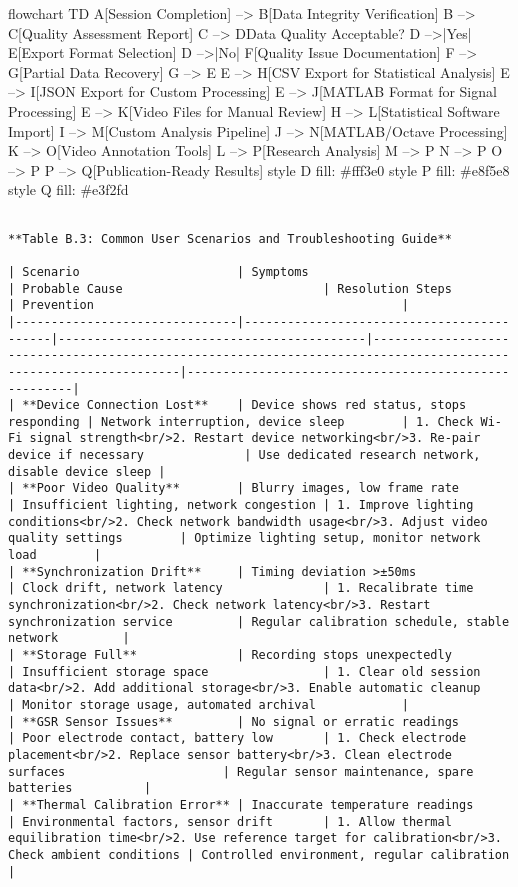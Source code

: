 \documentclass[11pt,a4paper]{report}
\begin{document}
flowchart TD
    A[Session Completion] --> B[Data Integrity Verification]
    B --> C[Quality Assessment Report]
    C --> D{Data Quality Acceptable?}
    D -->|Yes| E[Export Format Selection]
    D -->|No| F[Quality Issue Documentation]
    F --> G[Partial Data Recovery]
    G --> E
    E --> H[CSV Export for Statistical Analysis]
    E --> I[JSON Export for Custom Processing]
    E --> J[MATLAB Format for Signal Processing]
    E --> K[Video Files for Manual Review]
    H --> L[Statistical Software Import]
    I --> M[Custom Analysis Pipeline]
    J --> N[MATLAB/Octave Processing]
    K --> O[Video Annotation Tools]
    L --> P[Research Analysis]
    M --> P
    N --> P
    O --> P
    P --> Q[Publication-Ready Results]
    style D fill: \#fff3e0
    style P fill: \#e8f5e8
    style Q fill: \#e3f2fd
\begin{verbatim}

**Table B.3: Common User Scenarios and Troubleshooting Guide**

| Scenario                      | Symptoms                                  | Probable Cause                            | Resolution Steps                                                                                                | Prevention                                           |
|-------------------------------|-------------------------------------------|-------------------------------------------|-----------------------------------------------------------------------------------------------------------------|------------------------------------------------------|
| **Device Connection Lost**    | Device shows red status, stops responding | Network interruption, device sleep        | 1. Check Wi-Fi signal strength<br/>2. Restart device networking<br/>3. Re-pair device if necessary              | Use dedicated research network, disable device sleep |
| **Poor Video Quality**        | Blurry images, low frame rate             | Insufficient lighting, network congestion | 1. Improve lighting conditions<br/>2. Check network bandwidth usage<br/>3. Adjust video quality settings        | Optimize lighting setup, monitor network load        |
| **Synchronization Drift**     | Timing deviation >±50ms                   | Clock drift, network latency              | 1. Recalibrate time synchronization<br/>2. Check network latency<br/>3. Restart synchronization service         | Regular calibration schedule, stable network         |
| **Storage Full**              | Recording stops unexpectedly              | Insufficient storage space                | 1. Clear old session data<br/>2. Add additional storage<br/>3. Enable automatic cleanup                         | Monitor storage usage, automated archival            |
| **GSR Sensor Issues**         | No signal or erratic readings             | Poor electrode contact, battery low       | 1. Check electrode placement<br/>2. Replace sensor battery<br/>3. Clean electrode surfaces                      | Regular sensor maintenance, spare batteries          |
| **Thermal Calibration Error** | Inaccurate temperature readings           | Environmental factors, sensor drift       | 1. Allow thermal equilibration time<br/>2. Use reference target for calibration<br/>3. Check ambient conditions | Controlled environment, regular calibration          |


\end{verbatim}
\end{document}
